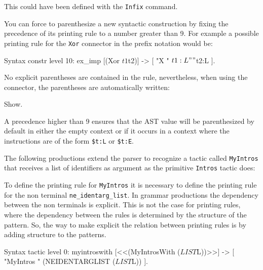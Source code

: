 {This could have been defined with the {\tt Infix} command.



You can force to parenthesize a new syntactic construction by fixing
the precedence of its printing rule to a number greater than 9. For
example a possible printing rule for the {\tt Xor} connector in the prefix
notation would be:

\begin{coq_example*}
Syntax constr level 10:
  ex_imp [(Xor $t1  $t2)] -> [ "X " $t1:L " " $t2:L ].
\end{coq_example*}

No explicit parentheses are contained in the rule, nevertheless, when
using the connector, the parentheses are automatically written:

\begin{coq_example}
Show.
\end{coq_example}

A precedence higher than 9 ensures that the AST value will be
parenthesized by default in either the empty context or if it occurs
in a context where the instructions are of the form
\verb+$t:L+ or \verb+$t:E+.



The following productions extend the parser to recognize a
tactic called \verb+MyIntros+ that receives a list of identifiers as
argument as the primitive \verb+Intros+ tactic does:


To define the printing rule for \verb+MyIntros+ it is necessary to
define the printing rule for the non terminal \verb+ne_identarg_list+.
In grammar productions the dependency between the non terminals is
explicit. This is not the case for printing rules, where the
dependency between the rules is determined by the structure of the
pattern. So, the way to make explicit the relation between printing
rules is by adding structure to the patterns.

\begin{coq_example}
Syntax tactic level 0:
  myintroswith [<<(MyIntrosWith ($LIST $L))>>] ->
   [ "MyIntros " (NEIDENTARGLIST ($LIST $L)) ].
\end{coq_example}

}
